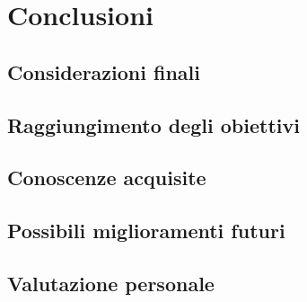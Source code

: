 \chapter{Conclusioni}
\label{cap:conclusioni}

\section{Considerazioni finali}

\section{Raggiungimento degli obiettivi}

\section{Conoscenze acquisite}

\section{Possibili miglioramenti futuri}

\section{Valutazione personale}
